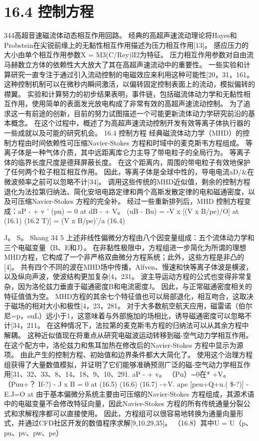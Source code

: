 \documentclass[UTF8,11pt,a4paper,openany,fontset=fandol]{ctexbook}
\begin{document}
\section{16.4 控制方程}
344高超音速磁流体动态相互作用回路。 经典的高超声速流动理论将Hayes和Probstein在尖锐前缘上的无黏性相互作用描述为压力相互作用[13]。 感应压力的大小由单个相互作用参数X = M3(C/Rey)lI2为特征。 压力相互作用参数对自由流马赫数立方体的依赖性大大放大了其在高超声速流动中的重要性。 一些实验和计算研究一直专注于通过引入流动控制的电磁效应来利用这种可能性[20，31，161。 这种控制机制可以在微秒内瞬间激活，以偏转固定控制表面上的流动，模拟偏转的襟翼。 实验和计算努力的初步结果表明，事件链，包括磁流体动力学和无黏性相互作用，使用简单的表面发光放电构成了非常有效的高超声速流动控制。 为了追求这一有前途的创新，目前的努力试图描述一个可能更新流体动力学研究前沿的基本概念。 在这个过程中，概述了为高超声速流动控制开发有效等离子体执行器的一些成就以及可能的研究机会。 16.4 控制方程 经典磁流体动力学（MHD）的控制方程由时间依赖性可压缩Navier-Stokes 方程和时域中的麦克斯韦方程组成。 等离子体是一种气体介质，其中远距离库仑力主导了带电粒子的全局行为。 等离子体的临界长度尺度是德拜屏蔽长度。 在这个距离内，周围的带电粒子有效地保护了任何两个粒子相互相互作用。 因此，等离子体是全球中性的，导电电流aD/\&在微波频率之前可以忽略不计[34]。 调用这些传统的MHD近似值，剩余的控制方程退化为法拉第归纳法、简化安培电路定律和两个高斯发散定律的电和磁通密度，以及可压缩Navier-Stokes 方程的完全补。 经过一些重新排列后，MHD 控制方程变成：aP - + v ' (pu) = 0 at dB - + V。 (uB - Bu) = -V x [(V x B/pe)/O] at (16.1) (16.2 T)] = (V x B/pe)'/a (16.4)

J。 S。 Shang 34 5 上述非线性偏微分方程由八个因变量组成：五个流体动力学和三个电磁变量（B、E和J）。 在非黏性极限中，方程组进一步简化为所谓的理想MHD方程，它构成了一个非严格双曲微分方程系统；此外，这些方程是非凸的[4]。 共有四个不同的波在MHD场中传播，Alfven、慢速和快等离子体波是横波，以及纵向声波，使波结构更加复杂[4，231。 波主导运动方程的公式也变得非常复杂，因为洛伦兹力垂直于磁通密度B和电流密度J。 因此，与正常磁通密度相关的特征值值为空。 MHD方程的其余七个特征值也可以局部退化，相互吻合，这取决于磁场的相对大小和极性[4，23，281。 对于大多数航空航天应用，磁雷诺（伯尔尼=p，ouL）远小于1，这意味着与外部施加的场相比，诱导磁通密度可以忽略不计[34，211。 在这种情况下，法拉第的麦克斯韦方程的归纳法可以从其余方程中解耦。 这种近似值现在将重点从研究电磁波运动转移到磁-空气动力学相互作用。 在这个配方中，洛伦兹力和焦耳加热在修改后的Navier-Stokes 方程中显示为源项。 由此产生的控制方程、初始值和边界条件都大大简化了。 使用这个治理方程组获得了大量数值模拟，并证明了它们能够准确预测广泛的磁-空气动力学相互作用[31、32、33、8、14、18、9、10、291. aP - + v。 （Pu）=0在* +V。 （Puu+？ If-?) - J x B = 0 at (16.5) (16.6) (16.7) -+V. ape [peu+Q+u.( \$-?)] -E.J=O at 由于基本偏微分系统主要由可压缩的Navier-Stokes 方程组成，其源术语中的电磁变量不会修改特征向量，因此Navier-Stokes 方程的所有传统通量分裂公式和求解程序都可以直接使用。 因此，方程组可以很容易地转换为通量向量形式，并通过CFD社区开发的数值程序求解[9,10,29,35]。 （16.8）其中U = U（p、pu、pv、pw、pe）
\end{document}
